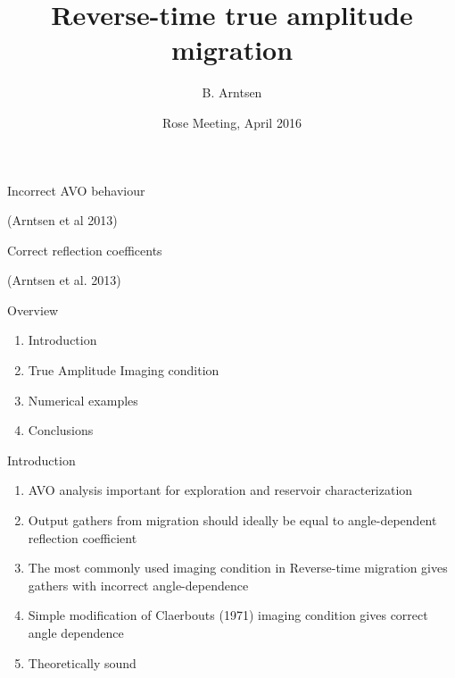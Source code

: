 \documentclass[xcolor=dvipsnames]{beamer}
\begin{document}
\title{Reverse-time true amplitude migration}
\author{B. Arntsen}
\date{Rose Meeting, April 2016}
\begin{frame}
 \titlepage
\end{frame}
\begin{frame}{Incorrect AVO behaviour}
\begin{figure}
\end{figure}
(Arntsen et al 2013)
\end{frame}
\begin{frame}{Correct reflection coefficents}
%
\begin{figure}
\end{figure}

(Arntsen et al. 2013)
\end{frame}
\begin{frame}{Overview}
\begin{enumerate}
  \item Introduction
  \item True Amplitude Imaging condition
  \item Numerical examples
  \item Conclusions
\end{enumerate}
\end{frame}
\begin{frame}{Introduction}
\begin{enumerate}
  \item AVO analysis important for exploration and reservoir characterization
  \item Output gathers from migration should ideally be equal to angle-dependent reflection coefficient
  \item The most commonly used imaging condition in Reverse-time migration gives gathers with incorrect angle-dependence
  \item Simple modification of Claerbouts (1971) imaging condition gives correct angle dependence
  \item Theoretically sound
\end{enumerate}
\end{frame}
\end{document}
